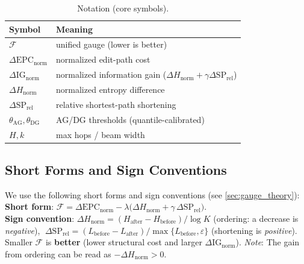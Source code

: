 \documentclass[12pt]{article}
\newcommand{\F}{\mathcal{F}}
\newcommand{\gednorm}{\Delta\mathrm{EPC}_{\mathrm{norm}}}
\newcommand{\ignorm}{\Delta\mathrm{IG}_{\mathrm{norm}}}
\begin{document}
\begin{table}[H]
  \centering
  \small
  \caption{Notation (core symbols).}
  \label{tab:notation}
  \begin{tabular}{@{}ll@{}}
  \toprule
  Symbol & Meaning \\
  \midrule
  $\F$ & unified gauge (lower is better) \\
  $\gednorm$ & normalized edit-path cost \\
  $\ignorm$ & normalized information gain ($\Delta H_{\mathrm{norm}} + \gamma \Delta \mathrm{SP}_{\mathrm{rel}}$) \\
  $\Delta H_{\mathrm{norm}}$ & normalized entropy difference \\
  $\Delta \mathrm{SP}_{\mathrm{rel}}$ & relative shortest-path shortening \\
  $\theta_{\mathrm{AG}}, \theta_{\mathrm{DG}}$ & AG/DG thresholds (quantile-calibrated) \\
  $H, k$ & max hops / beam width \\
  \bottomrule
  \end{tabular}
\end{table}

\subsection*{Short Forms and Sign Conventions}
We use the following short forms and sign conventions (see \cref{sec:gauge_theory}):\\
\noindent\textbf{Short form}: $\F=\gednorm-\lambda\bigl(\Delta H_{\mathrm{norm}}+\gamma\,\Delta\mathrm{SP}_{\mathrm{rel}}\bigr)$.\\
\noindent\textbf{Sign convention}: $\Delta H_{\mathrm{norm}}=(H_{\mathrm{after}}-H_{\mathrm{before}})/\log K$ (ordering: a decrease is \emph{negative}), $\;\Delta\mathrm{SP}_{\mathrm{rel}}=(L_{\mathrm{before}}-L_{\mathrm{after}})/\max\{L_{\mathrm{before}},\varepsilon\}$ (shortening is \emph{positive}).
Smaller $\F$ is \textbf{better} (lower structural cost and larger $\Delta\mathrm{IG}_{\mathrm{norm}}$).
\textit{Note}: The gain from ordering can be read as $-\Delta H_{\mathrm{norm}}>0$.
\end{document}
